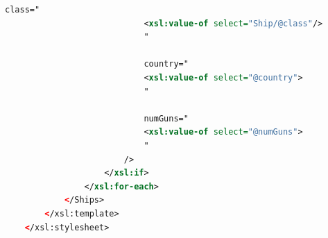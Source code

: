 \documentclass[12pt]{article}
\begin{document}
\begin{enumerate}[1.]
\begin{enumerate}[a)]
\begin{lstlisting}[language=XML]
                            class="
                            <xsl:value-of select="Ship/@class"/>
                            "

                            country="
                            <xsl:value-of select="@country">
                            "

                            numGuns="
                            <xsl:value-of select="@numGuns">
                            "
                        />
                    </xsl:if>
                </xsl:for-each>
            </Ships>
        </xsl:template>
    </xsl:stylesheet>
    \end{lstlisting}
    \end{enumerate}
\end{enumerate}
\end{document}
